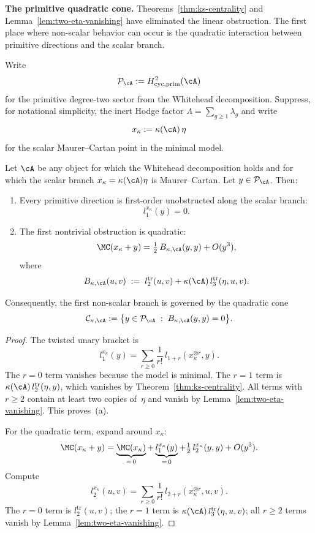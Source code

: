 \medskip

\noindent\textbf{The primitive quadratic cone.}\enspace
Theorems~\ref{thm:ks-centrality} and Lemma~\ref{lem:two-eta-vanishing}
have eliminated the linear obstruction. The first place where non-scalar
behavior can occur is the quadratic interaction between primitive
directions and the scalar branch.

\begin{notation}
\label{not:primitive-sector}
Write
\[
\mathcal{P}_\cA := H^2_{\mathrm{cyc,prim}}(\cA)
\]
for the primitive degree-two sector from the Whitehead decomposition.
Suppress, for notational simplicity, the inert Hodge factor
$\Lambda = \sum_{g \geq 1} \lambda_g$ and write
\[
x_\kappa := \kappa(\cA)\,\eta
\]
for the scalar Maurer--Cartan point in the minimal model.
\end{notation}

\begin{theorem}
\label{thm:quadratic-frontier}
Let $\cA$ be any object for which the Whitehead decomposition holds and
for which the scalar branch $x_\kappa = \kappa(\cA)\eta$ is
Maurer--Cartan. Let $y \in \mathcal{P}_\cA$. Then:
\begin{enumerate}[label=\textup{(\alph*)}]
\item Every primitive direction is first-order unobstructed along the
scalar branch:
\[
l_1^{x_\kappa}(y) = 0.
\]
\item The first nontrivial obstruction is quadratic:
\[
\MC(x_\kappa + y)
= \tfrac{1}{2}\, B_{\kappa,\cA}(y,y) + O(y^3),
\]
where
\[
B_{\kappa,\cA}(u,v)
\;:=\;
l_2^{\mathrm{tr}}(u,v)
+ \kappa(\cA)\,l_3^{\mathrm{tr}}(\eta, u, v).
\]
\end{enumerate}
Consequently, the first non-scalar branch is governed by the quadratic
cone
\[
\mathcal{C}_{\kappa,\cA}
:= \bigl\{
 y \in \mathcal{P}_\cA
 \;:\;
 B_{\kappa,\cA}(y,y) = 0
\bigr\}.
\]
\end{theorem}

\begin{proof}
The twisted unary bracket is
\[
l_1^{x_\kappa}(y)
= \sum_{r \geq 0} \frac{1}{r!}\,
 l_{1+r}(x_\kappa^{\otimes r}, y).
\]
The $r = 0$ term vanishes because the model is minimal. The $r = 1$
term is $\kappa(\cA)\, l_2^{\mathrm{tr}}(\eta, y)$, which vanishes by
Theorem~\ref{thm:ks-centrality}. All terms with $r \geq 2$ contain at
least two copies of~$\eta$ and vanish by
Lemma~\ref{lem:two-eta-vanishing}. This proves~(a).

For the quadratic term, expand around $x_\kappa$:
\[
\MC(x_\kappa + y)
= \underbrace{\MC(x_\kappa)}_{=\,0}
 + \underbrace{l_1^{x_\kappa}(y)}_{=\,0}
 + \tfrac{1}{2}\, l_2^{x_\kappa}(y,y)
 + O(y^3).
\]
Compute
\[
l_2^{x_\kappa}(u,v)
= \sum_{r \geq 0} \frac{1}{r!}\,
 l_{2+r}(x_\kappa^{\otimes r}, u, v).
\]
The $r = 0$ term is $l_2^{\mathrm{tr}}(u,v)$; the $r = 1$ term is
$\kappa(\cA)\, l_3^{\mathrm{tr}}(\eta, u, v)$; all $r \geq 2$ terms
vanish by Lemma~\ref{lem:two-eta-vanishing}.
\end{proof}

